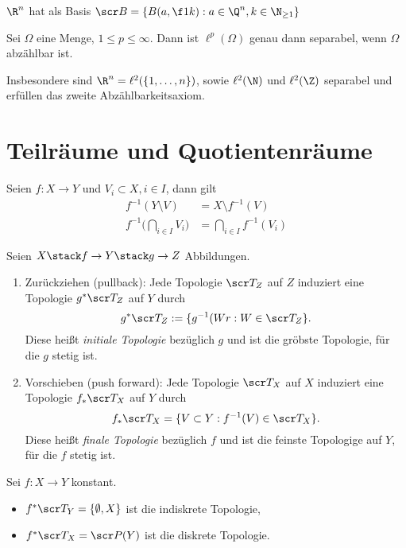 \begin{ex}
	$\R^n$ hat als Basis $\scr B = \{ B(a, \f 1k) : a \in \Q^n, k \in \N_{\ge 1} \}$
\end{ex}

\begin{st}
	Sei $\Omega$ eine Menge, $1 \le p \le \infty$.
	Dann ist $\ell^p(\Omega)$ genau dann separabel, wenn $\Omega$ abzählbar ist.

	Insbesondere sind $\R^n = \ell^2(\{1, \dotsc, n\})$, sowie $\ell^2(\N)$ und $\ell^2(\Z)$ separabel und erfüllen das zweite Abzählbarkeitsaxiom.
\end{st}


\section{Teilräume und Quotientenräume}


Seien $f: X \to Y$ und $V_i \subset X, i \in I$, dann gilt
\begin{align*}
	f^{-1}(Y \setminus V) &= X \setminus f^{-1}(V) \\
	f^{-1}\Big(\bigcap_{i\in I} V_i\Big) &= \bigcap_{i\in I} f^{-1}(V_i)
\end{align*}
\begin{df}
	Seien $X \stack f\to Y \stack g\to Z$ Abbildungen.
	\begin{enumerate}[(1)]
		\item
			Zurückziehen (pullback):
			Jede Topologie $\scr T_Z$ auf $Z$ induziert eine Topologie $g^*\scr T_Z$ auf $Y$ durch
			\[
				g^* \scr T_Z
				:= \{ g^{-1}(Wr : W \in \scr T_Z \}.
			\]
			Diese heißt \emph{initiale Topologie} bezüglich $g$ und ist die gröbste Topologie, für die $g$ stetig ist.
		\item
			Vorschieben (push forward):
			Jede Topologie $\scr T_X$ auf $X$ induziert eine Topologie $f_* \scr T_X$ auf $Y$ durch
			\[
				f_* \scr T_X = \{ V \subset Y : f^{-1}(V) \in \scr T_X \}.
			\]
			Diese heißt \emph{finale Topologie} bezüglich $f$ und ist die feinste Topologige auf $Y$, für die $f$ stetig ist.
	\end{enumerate}
\end{df}

\begin{ex}
	Sei $f: X \to Y$ konstant.
	\begin{itemize}
		\item
			$f^* \scr T_Y = \{ \emptyset, X \}$ ist die indiskrete Topologie,
		\item
			$f^* \scr T_X = \scr P(Y)$ ist die diskrete Topologie.
	\end{itemize}
\end{ex}

